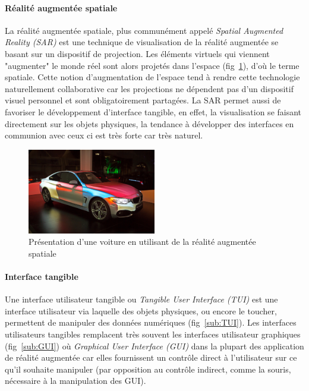 \paragraph{Réalité augmentée spatiale}
La réalité augmentée spatiale, plus communément appelé \emph{Spatial Augmented Reality (SAR)} est une technique de visualisation de la réalité augmentée se basant sur un dispositif de projection. Les éléments virtuels qui viennent "augmenter" le monde réel sont alors projetés dans l'espace (fig~\ref{fig:SAR}), d'où le terme spatiale. Cette notion d'augmentation de l'espace tend à rendre cette technologie naturellement collaborative car les projections ne dépendent pas d'un dispositif visuel personnel et sont obligatoirement partagées. La SAR permet aussi de favoriser le développement d'interface tangible, en effet, la visualisation se faisant directement sur les objets physiques, la tendance à développer des interfaces en communion avec ceux ci est très forte car très naturel.

\begin{figure}[H]
\centering
\includegraphics[width=0.5\textwidth]{images/SARMappingCar2}
\caption{Présentation d'une voiture en utilisant de la réalité augmentée spatiale\protect\footnotemark}
\label{fig:SAR}
\end{figure}

\paragraph{Interface tangible}
Une interface utilisateur tangible ou \emph{Tangible User Interface (TUI)} est une interface utilisateur via laquelle des objets physiques, ou encore le toucher, permettent de manipuler des données numériques (fig~\ref{sub:TUI}). Les interfaces utilisateurs tangibles remplacent très souvent les interfaces utilisateur graphiques (fig~\ref{sub:GUI}) où \emph{Graphical User Interface (GUI)} dans la plupart des application de réalité augmentée car elles fournissent un contrôle direct à l'utilisateur sur ce qu'il souhaite manipuler (par opposition au contrôle indirect, comme la souris, nécessaire à la manipulation des GUI).


